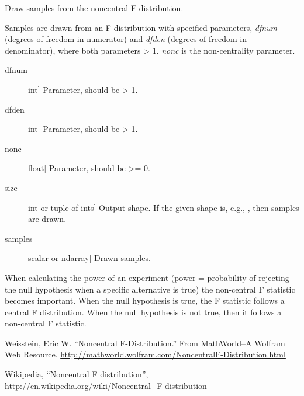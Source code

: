 \documentclass[letterpaper,10pt,english]{sphinxmanual}
\begin{document}

\begin{fulllineitems}
\label{pygeomod:pygeomod.geomodeller_xml_obj.noncentral_f}
Draw samples from the noncentral F distribution.

Samples are drawn from an F distribution with specified parameters,
\emph{dfnum} (degrees of freedom in numerator) and \emph{dfden} (degrees of
freedom in denominator), where both parameters \textgreater{} 1.
\emph{nonc} is the non-centrality parameter.
\begin{description}
\item[{dfnum}] \leavevmode{[}int{]}
Parameter, should be \textgreater{} 1.

\item[{dfden}] \leavevmode{[}int{]}
Parameter, should be \textgreater{} 1.

\item[{nonc}] \leavevmode{[}float{]}
Parameter, should be \textgreater{}= 0.

\item[{size}] \leavevmode{[}int or tuple of ints{]}
Output shape. If the given shape is, e.g., , then
 samples are drawn.

\end{description}
\begin{description}
\item[{samples}] \leavevmode{[}scalar or ndarray{]}
Drawn samples.

\end{description}

When calculating the power of an experiment (power = probability of
rejecting the null hypothesis when a specific alternative is true) the
non-central F statistic becomes important.  When the null hypothesis is
true, the F statistic follows a central F distribution. When the null
hypothesis is not true, then it follows a non-central F statistic.

Weisstein, Eric W. ``Noncentral F-Distribution.'' From MathWorld--A Wolfram
Web Resource.  \href{http://mathworld.wolfram.com/NoncentralF-Distribution.html}{http://mathworld.wolfram.com/NoncentralF-Distribution.html}

Wikipedia, ``Noncentral F distribution'',
\href{http://en.wikipedia.org/wiki/Noncentral\_F-distribution}{http://en.wikipedia.org/wiki/Noncentral\_F-distribution}


\end{fulllineitems}
\end{document}
